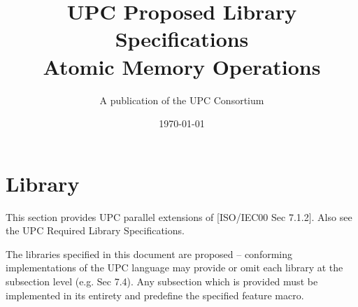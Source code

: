 \newcommand{\myspecversion}{Version 1.3}
\newcommand{\mydraftversion}{Draft 3.3}
\newcommand{\myversion}{\specversion}
\newcommand{\mytitle}{UPC Proposed Library Specifications\\
                      Atomic Memory Operations}


\makeindex

\title{\mytitle\\
\myversion}

\author{A publication of the UPC Consortium}

\date{\today}



\maketitle

\setcounter{page}{2}
\dotoc

\setcounter{section}{6} %
\section{Library}

\npf This section provides UPC parallel extensions of [ISO/IEC00 Sec 7.1.2]. Also see the UPC Required Library Specifications.

\np The libraries specified in this document are proposed --
conforming implementations of the UPC language may provide or 
omit each library at the subsection level (e.g. Sec 7.4). 
Any subsection which is provided must be implemented in its
entirety and predefine the specified feature macro.

\setcounter{subsection}{3} %


\doindex

